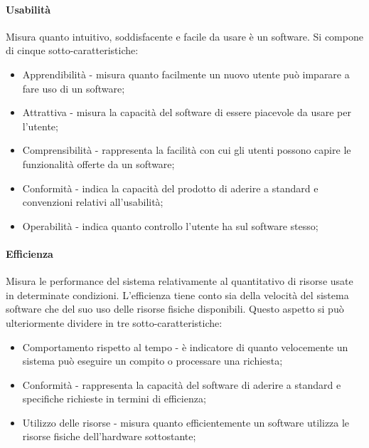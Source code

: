 \documentclass[10pt]{article}
\begin{document}
\begin{justify}
            \paragraph{Usabilità}
            Misura quanto intuitivo, soddisfacente e facile da usare è un software. Si compone di cinque sotto-caratteristiche:
            \begin{itemize}
                \item Apprendibilità - misura quanto facilmente un nuovo utente può imparare a fare uso di un software;
                \item Attrattiva - misura la capacità del software di essere piacevole da usare per l'utente;
                \item Comprensibilità - rappresenta la facilità con cui gli utenti possono capire le funzionalità offerte da un software;
                \item Conformità - indica la capacità del prodotto di aderire a standard e convenzioni relativi all'usabilità;
                \item Operabilità - indica quanto controllo l'utente ha sul software stesso;
            \end{itemize}

            \paragraph{Efficienza}
            Misura le performance del sistema relativamente al quantitativo di risorse usate in determinate condizioni. L'efficienza tiene conto sia della velocità
            del sistema software che del suo uso delle risorse fisiche disponibili. Questo aspetto si può ulteriormente dividere in tre sotto-caratteristiche:
            \begin{itemize}
                \item Comportamento rispetto al tempo - è indicatore di quanto velocemente un sistema può eseguire un compito o processare una richiesta;
                \item Conformità - rappresenta la capacità del software di aderire a standard e specifiche richieste in termini di efficienza;
                \item Utilizzo delle risorse - misura quanto efficientemente un software utilizza le risorse fisiche dell'hardware sottostante;
            \end{itemize}


\end{justify}
\end{document}
